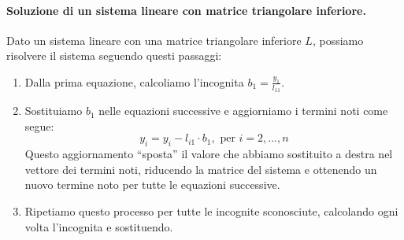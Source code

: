 \documentclass{article}
\begin{document}
\paragraph{Soluzione di un sistema lineare con matrice triangolare
inferiore.}
Dato un sistema lineare con una matrice triangolare inferiore $L$, possiamo
risolvere il sistema seguendo questi passaggi:
\begin{enumerate}
    \item Dalla prima equazione, calcoliamo l'incognita
        $b_1=\frac{y_1}{l_{11}}$.
    \item Sostituiamo $b_1$ nelle equazioni successive e aggiorniamo i termini
        noti come segue: $$y_i=y_i-l_{i1}\cdot b_1, \text{ per }i=2,\ldots,n$$
        Questo aggiornamento ``sposta'' il valore che abbiamo sostituito a
        destra nel vettore dei termini noti, riducendo la matrice del sistema
        e ottenendo un nuovo termine noto per tutte le equazioni successive.
    \item Ripetiamo questo processo per tutte le incognite sconosciute,
        calcolando ogni volta l'incognita e sostituendo.
\end{enumerate}
\end{document}
